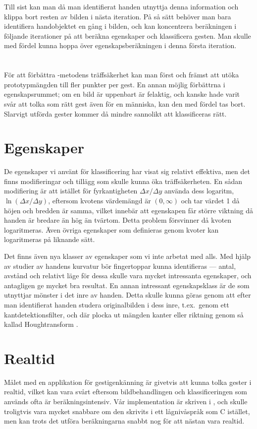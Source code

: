 \documentclass[../rapport_MVEX01-11-05]{subfiles}
\begin{document}
Till sist kan man då man identifierat handen utnyttja denna information och
klippa bort resten av bilden i nästa iteration. På så sätt behöver man bara
identifiera handobjektet en gång i bilden, och kan koncentrera beräkningen
i följande iterationer på att beräkna egenskaper och klassificera gesten.
Man skulle med fördel kunna hoppa över egenskapsberäkningen i denna första
iteration.

\section{\knn}
För att förbättra \knn-metodens träffsäkerhet kan man först och
främst att utöka prototypmängden till fler punkter per gest. En annan möjlig
förbättrna i egenskapsrummet; om en bild är uppenbart är felaktig, och
kanske hade varit
svår att tolka som rätt gest även för en människa,
kan den med fördel tas bort.
Slarvigt utförda gester kommer då mindre sannolikt att
klassificeras rätt.

\section{Egenskaper}
De egenskaper vi använt för klassificering har visat sig relativt
effektiva, men det finns modifieringar och tillägg som skulle kunna
öka träffsäkerheten.
En sådan modifiering är att istället för fyrkantigheten $\Delta
x/\Delta y$ använda dess logaritm, $\ln(\Delta x/\Delta
y)$, eftersom kvotens värdemängd är $(0,\infty)$ och tar värdet 1 då
höjen och bredden är samma, vilket innebär att egenskapen får större
viktning då handen är bredare än hög än tvärtom. Detta problem
försvinner då kvoten logaritmeras. Även övriga egenskaper som
definieras genom kvoter kan logaritmeras på liknande sätt.

Det finns även nya klasser av egenskaper som vi inte arbetat med
alls. Med hjälp av studier av handens kurvatur bör fingertoppar kunna
identifieras --- antal, avstånd och relativt läge för dessa skulle vara
mycket intressanta egenskaper, och antagligen ge mycket bra resultat.
En annan intressant egenskapsklass är de som utnyttjar mönster i det
inre av handen. Detta skulle kunna göras
genom att efter man identifierat handen studera originalbilden i dess
inre, t.ex.~genom ett kantdetektionsfilter, och där plocka ut mängden
kanter eller riktning genom så kallad Houghtransform \cite[s.~23]{Rudemo09}.

\section{Realtid}
Målet med en applikation för gestigenkänning är givetvis att kunna tolka
gester i realtid, vilket kan vara svårt eftersom bildbehandlingen och
klassificeringen som används ofta är beräkningsintensiv. Vår implementation
är skriven i \MATLAB, och skulle troligtvis vara mycket snabbare om den
skrivits i ett lågnivåspråk som C istället, men kan trots det utföra
beräkningarna snabbt nog för att nästan vara realtid.
\end{document}
